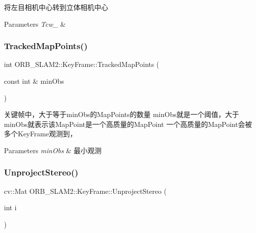 将左目相机中心转到立体相机中心 


\begin{DoxyParams}{Parameters}
{\em Tcw\+\_\+} & \\
\hline
\end{DoxyParams}
\mbox{\label{class_o_r_b___s_l_a_m2_1_1_key_frame_a729cbf2c84db5cbfdda98a9612f8cd0b}} 
\subsubsection{\texorpdfstring{Tracked\+Map\+Points()}{TrackedMapPoints()}}
{\footnotesize\ttfamily int O\+R\+B\+\_\+\+S\+L\+A\+M2\+::\+Key\+Frame\+::\+Tracked\+Map\+Points (\begin{DoxyParamCaption}\item[{const int \&}]{min\+Obs }\end{DoxyParamCaption})}



关键帧中，大于等于min\+Obs的\+Map\+Points的数量 min\+Obs就是一个阈值，大于min\+Obs就表示该\+Map\+Point是一个高质量的\+Map\+Point 一个高质量的\+Map\+Point会被多个\+Key\+Frame观测到， 


\begin{DoxyParams}{Parameters}
{\em min\+Obs} & 最小观测 \\
\hline
\end{DoxyParams}
\mbox{\label{class_o_r_b___s_l_a_m2_1_1_key_frame_a0d2dc03ca0d62fc5585773e43d503e79}} 
\subsubsection{\texorpdfstring{Unproject\+Stereo()}{UnprojectStereo()}}
{\footnotesize\ttfamily cv\+::\+Mat O\+R\+B\+\_\+\+S\+L\+A\+M2\+::\+Key\+Frame\+::\+Unproject\+Stereo (\begin{DoxyParamCaption}\item[{int}]{i }\end{DoxyParamCaption})}



